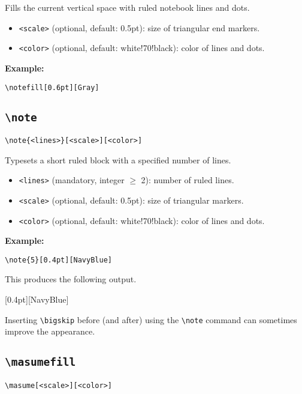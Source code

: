 \documentclass[a4paper,12pt]{article}
\begin{document}
Fills the current vertical space with ruled notebook lines and dots.

\begin{itemize}
    \item \texttt{<scale>} (optional, default: 0.5pt): size of triangular end markers.
    \item \texttt{<color>} (optional, default: white!70!black): color of lines and dots.
\end{itemize}

\textbf{Example:}
\begin{verbatim}
\notefill[0.6pt][Gray]
\end{verbatim}

\subsection{\texttt{\textbackslash note}}
\begin{verbatim}
\note{<lines>}[<scale>][<color>]
\end{verbatim}

Typesets a short ruled block with a specified number of lines.

\begin{itemize}
    \item \texttt{<lines>} (mandatory, integer $\ge$ 2): number of ruled lines.
    \item \texttt{<scale>} (optional, default: 0.5pt): size of triangular markers.
    \item \texttt{<color>} (optional, default: white!70!black): color of lines and dots.
\end{itemize}

\textbf{Example:}
\begin{verbatim}
\note{5}[0.4pt][NavyBlue]
\end{verbatim}

This produces the following output.\bigskip

[0.4pt][NavyBlue]

\bigskip Inserting \verb|\bigskip| before (and after) using the \verb|\note| command can sometimes improve the appearance.

\subsection{\texttt{\textbackslash masumefill}}
\begin{verbatim}
\masume[<scale>][<color>]
\end{verbatim}
\end{document}
